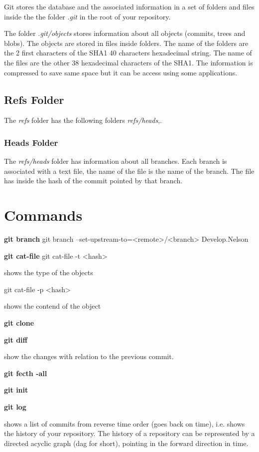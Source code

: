 Git stores the database and the associated information in a set of folders and files inside the the folder \emph{.git} in the root of your repository.

The folder \emph{.git/objects} stores information about all objects (commits, trees and blobs).
The objects are stored in files inside folders.
The name of the folders are the 2 first characters of the SHA1 40 characters hexadecimal string.
The name of the files are the other 38 hexadecimal characters of the SHA1.
The information is compressed to save same space but it can be access using some applications.

\subsection{Refs Folder}

The \emph{refs} folder has the following folders \emph{refs/heads},.

\subsubsection{Heads Folder}
The \emph{refs/heads} folder has information about all branches.
Each branch is associated with a text file, the name of the file is the name of the branch.
The file has inside the hash of the commit pointed by that branch.


\section{Commands}

\textbf{git branch}
git branch --set-upstream-to=<remote>/<branch> Develop.Nelson

\textbf{git cat-file}
git cat-file -t <hash>

shows the type of the objects

git cat-file -p <hash>

shows the contend of the object

\textbf{git clone}

\textbf{git diff}

show the changes with relation to the previous commit.

\textbf{git fecth -all}

\textbf{git init}

\textbf{git log}

shows a list of commits from reverse time order (goes back on time), i.e. shows the history of your repository. The history of a repository can be represented by a directed acyclic graph (dag for short), pointing in the forward direction in time.

